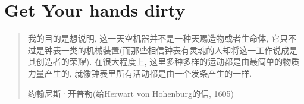 % 
% 
% 
% 
% 
% 
% 
% 
% 
% 
% 
% 

\section{Get Your hands dirty}
\begin{quotation}
  我的目的是想说明, 这一天空机器并不是一种天赐造物或者生命体, 它只不过是钟表一类的机械装置(而那些相信钟表有灵魂的人却将这一工作说成是其创造者的荣耀). 在很大程度上, 这里多种多样的运动都是由最简单的物质力量产生的, 就像钟表里所有活动都是由一个发条产生的一样. 
  
  约翰尼斯·开普勒(给Herwart von Hohenburg的信, 1605)
\end{quotation}

